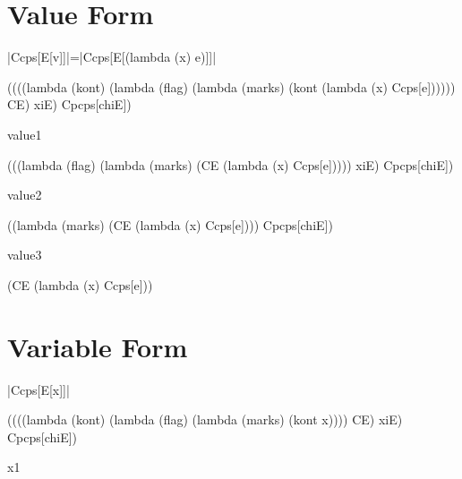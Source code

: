 \section{Value Form}

\noindent
\scheme|Ccps[E[v]]|=\scheme|Ccps[E[(lambda (x) e)]]|

\begin{schemeblock}
\begin{schemedisplay}
((((lambda (kont)
     (lambda (flag)
       (lambda (marks)
         (kont (lambda (x) Ccps[e])))))
   CE) xiE) Cpcps[chiE])
\end{schemedisplay}
\end{schemeblock}

\noindent
value1

\begin{schemeblock}
\begin{schemedisplay}
(((lambda (flag)
    (lambda (marks)
      (CE (lambda (x) Ccps[e]))))
  xiE) Cpcps[chiE])
\end{schemedisplay}
\end{schemeblock}

\noindent
value2

\begin{schemeblock}
\begin{schemedisplay}
((lambda (marks)
   (CE (lambda (x) Ccps[e])))
 Cpcps[chiE])
\end{schemedisplay}
\end{schemeblock}

\noindent
value3

\begin{schemeblock}
\begin{schemedisplay}
(CE (lambda (x) Ccps[e]))
\end{schemedisplay}
\end{schemeblock}

\section{Variable Form}

\noindent
\scheme|Ccps[E[x]]|
\begin{schemeblock}
\begin{schemedisplay}
((((lambda (kont)
     (lambda (flag)
       (lambda (marks)
         (kont x))))
   CE) xiE) Cpcps[chiE])
\end{schemedisplay}
\end{schemeblock}

\noindent
x1

